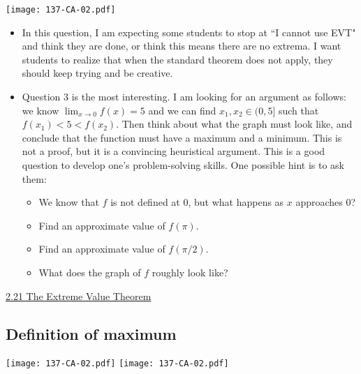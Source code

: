 \documentclass[11pt]{article}
\newcommand{\n}{\newpage}
\newcommand {\DS} [1] {${\displaystyle #1}$}
\newcommand{\nl}{\hfill \vspace{-1.1\baselineskip}} %
\newcommand{\vxxi}{\hspace{8mm} \href{https://www.youtube.com/watch?v=r5Tz0wi5RRU&list=PLlwePzQY_wW8P_I8BFgm0-upywEwTKd8_&index=21}{2.21 The Extreme Value Theorem}}
\begin{document}
\begin{center}
{ \texttt{[image: 137-CA-02.pdf]}}
\end{center}

\begin{comments}
\nl
	\begin{itemize}
		\item  In this question, I am expecting some students to stop at  ``I cannot use EVT" and think they are done, or think this means there are no extrema. I want students to realize that when the standard theorem does not apply, they should keep trying and be creative.
		\item Question 3 is the most interesting.  I am looking for an argument as follows:  we know \DS{\lim_{x \to 0}f(x) =5} and we can find $x_1, x_2 \in (0, 5]$ such that \DS{f(x_1) < 5 < f(x_2)}.  Then think about what the graph must look like, and conclude that the function must have a maximum and a minimum.  This is not a proof, but it is a convincing heuristical argument.    This is a good question to develop one's problem-solving skills.  %
		One possible hint is to ask them: 
			\begin{itemize}
			\item We know that $f$ is not defined at $0$, but what happens as $x$ approaches $0$?
			\item Find an approximate value of $f(\pi)$.
			\item Find an approximate value of $f(\pi/2)$.
			\item What does the graph of $f$ roughly look like?
			\end{itemize}
	\end{itemize}
\end{comments}

\begin{videos}
\vxxi
\end{videos}

\n
\newpage
\subsection{Definition of maximum} 

\begin{center}
{ \texttt{[image: 137-CA-02.pdf]}}
\quad
{ \texttt{[image: 137-CA-02.pdf]}}
\end{center}
\end{document}
